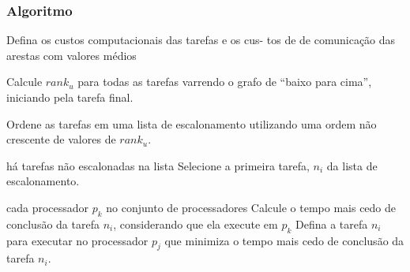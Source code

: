 \documentclass{beamer}
\begin{document}
\begin{frame}
\frametitle{Algoritmo}
	\begin{codebox}
	\li	Defina os custos computacionais das tarefas e os cus-
	\zi tos de de comunicação das arestas com valores médios

	\li	Calcule $rank_u$ para todas as tarefas varrendo o grafo
	\zi de ``baixo para cima'',	iniciando pela tarefa final.

	\li Ordene as tarefas em uma lista de escalonamento utilizando
	\zi uma ordem não crescente de valores de $rank_u$.

	\li 	\While há tarefas não escalonadas na lista
	\li 		\Do
					Selecione a primeira tarefa, $n_i$ da lista de escalonamento.

	\li				\For cada processador $p_k$ no conjunto de processadores
	\li 				\Do
							Calcule o tempo mais cedo de conclusão da tarefa  $n_i$,
	\zi						considerando que ela execute em $p_k$
						\End
	\li				Defina a tarefa $n_i$ para executar no processador $p_j$ que
	\zi					minimiza o tempo mais cedo de conclusão da tarefa $n_i$.
				\End
	\End
	\end{codebox}
\end{frame}
\end{document}
